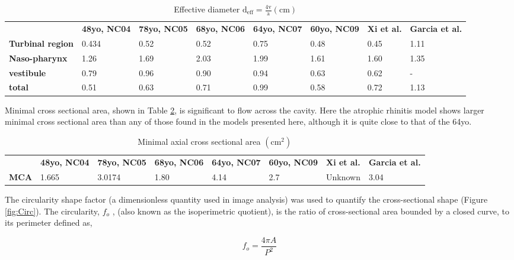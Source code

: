 \begin{table}
  \begin{tabular}{p{}p{}p{}p{}p{}p{}p{}p{}}
& \textbf{48yo, NC04}  & \textbf{78yo, NC05} & \textbf{68yo, NC06} & \textbf{64yo, NC07} & \textbf{60yo, NC09} & \textbf{Xi et al.} & \textbf{Garcia et al.}\\
 \cline{2-8}
\textbf{Turbinal region} & 0.434 & 0.52 & 0.52 & 0.75 & 0.48 & 0.45 & 1.11\\
\textbf{Naso-pharynx} & 1.26 & 1.69 & 2.03 & 1.99 & 1.61 & 1.60 & 1.35\\
\textbf{vestibule} & 0.79 & 0.96 & 0.90 & 0.94 & 0.63 & 0.62 &  - \\
\textbf{total} & 0.51 & 0.63 & 0.71 & 0.99 & 0.58 & 0.72 & 1.13 \\
\hline
\end{tabular}
\caption{Effective diameter $\mathrm{d_{eff} = \frac{4v}{a} (cm)}$}\label{tab:deff}
\end{table}

Minimal cross sectional area, shown in Table \ref{tab:mca}, is significant to flow across the cavity\cite{Lindemann2008}. Here the atrophic rhinitis model shows larger minimal cross sectional area than any of those found in the models presented here, although it is quite close to that of the 64yo.

\begin{table}
  \begin{tabular}{p{}p{}p{}p{}p{}p{}p{}p{}}
& \textbf{48yo, NC04}  & \textbf{78yo, NC05} & \textbf{68yo, NC06} & \textbf{64yo, NC07} & \textbf{60yo, NC09} & \textbf{Xi et al.} & \textbf{Garcia et al.}\\
 \cline{2-8}
 \textbf{MCA}&1.665&3.0174&1.80&4.14&2.7&Unknown&3.04
\end{tabular}
\caption{Minimal axial cross sectional area $\mathrm{(cm^2)}$}\label{tab:mca}
\end{table}
The circularity shape factor (a dimensionless quantity used in image analysis) was used to quantify the cross-sectional shape (Figure \ref{fig:Circ}). The circularity, $f_o$ , (also known as the isoperimetric quotient), is the ratio of cross-sectional area bounded by a closed curve, to its perimeter defined as, 

\begin{equation}
f_o = \frac{4 \pi A}{P^2}
\end{equation}

